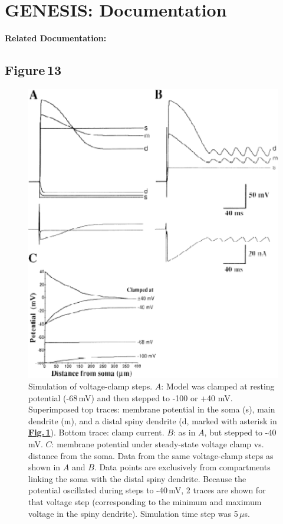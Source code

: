 \documentclass[12pt]{article}
\begin{document}
\section*{GENESIS: Documentation}

{\bf Related Documentation:}

\subsection*{Figure\,13}

\begin{figure}[h]
\centering
   \includegraphics[scale=0.75]{figures/Fig.1.13.eps}
   \caption{Simulation of voltage-clamp steps. $A$: Model was clamped at resting potential (-68\,mV) and then stepped to -100 or +40 mV. Superimposed top traces: membrane potential in the soma (s), main dendrite (m), and a distal spiny dendrite (d, marked with asterisk in \href{../pub-purkinje-deschutter1-fig-1/pub-purkinje-deschutter1-fig-1.tex}{\bf Fig.\,1}). Bottom trace: clamp current. $B$: as in $A$, but stepped to -40\,mV. $C$: membrane potential under steady-state voltage clamp vs. distance from the soma. Data from the same voltage-clamp steps as shown in $A$ and $B$. Data points are exclusively from compartments linking the soma with the distal spiny dendrite. Because the potential oscillated during steps to -40\,mV, 2 traces are shown for that voltage step (corresponding to the minimum and maximum voltage in the spiny dendrite). Simulation time step was 5\,$\mu$s.}
   \label{fig:DS1.13}
\end{figure}



\end{document}
